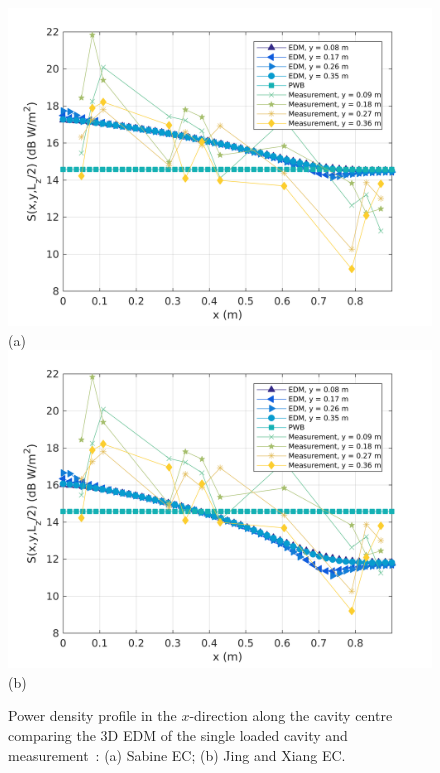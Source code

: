 \documentclass[a4paper]{article}
\numberwithin{equation}{section}
\begin{document}
\begin{figure}[ht]
\begin{center}
\includegraphics[width=0.6\linewidth]{figures/SDM_3D_SL_PowerDensityProfileXMeas}\\
{\footnotesize (a)}\\
\vspace{2mm}
\includegraphics[width=0.6\linewidth]{figures/SDM_3D_SL_PowerDensityProfileXMeas_JX}\\
{\footnotesize (b)}\\
\vspace{-2mm}
\caption{\label{fg:measprofssl} Power density profile in the $x$-direction along the cavity centre comparing
the 3D EDM of the single loaded cavity and measurement~\citep{Flintoft2017b}: (a) Sabine EC; (b) Jing and Xiang EC.}
\end{center}
\end{figure}
\end{document}
